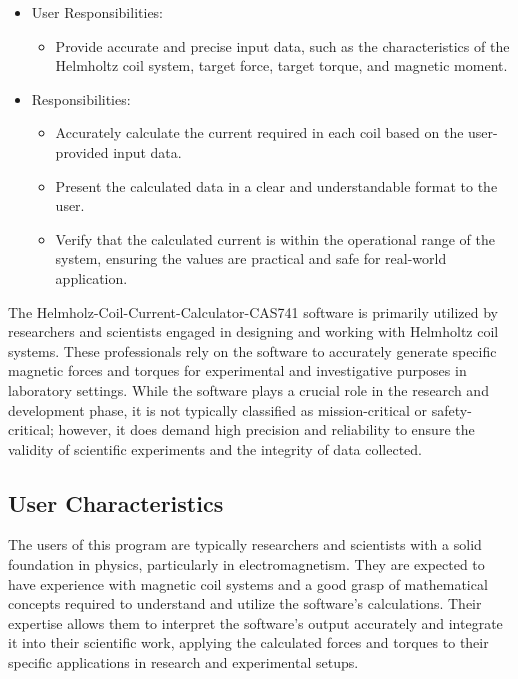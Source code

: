 \documentclass[12pt]{article}
\begin{document}
\begin{itemize}
\item User Responsibilities:
\begin{itemize}
\item Provide accurate and precise input data, such as the characteristics of the Helmholtz coil system, target force, target torque, and magnetic moment.

\end{itemize}
\item \progname{} Responsibilities:
\begin{itemize}
\item Accurately calculate the current required in each coil based on the user-provided input data.
\item Present the calculated data in a clear and understandable format to the user.
\item Verify that the calculated current is within the operational range of the system, ensuring the values are practical and safe for real-world application.
\end{itemize}
\end{itemize}
{
The Helmholz-Coil-Current-Calculator-CAS741 software is primarily utilized by researchers and scientists engaged in designing and working with Helmholtz coil systems. These professionals rely on the software to accurately generate specific magnetic forces and torques for experimental and investigative purposes in laboratory settings. While the software plays a crucial role in the research and development phase, it is not typically classified as mission-critical or safety-critical; however, it does demand high precision and reliability to ensure the validity of scientific experiments and the integrity of data collected.
}

\subsection{User Characteristics} \label{SecUserCharacteristics}

The users of this program are typically researchers and scientists with a solid foundation in physics, particularly in electromagnetism. They are expected to have experience with magnetic coil systems and a good grasp of mathematical concepts required to understand and utilize the software's calculations. Their expertise allows them to interpret the software's output accurately and integrate it into their scientific work, applying the calculated forces and torques to their specific applications in research and experimental setups.
\end{document}
